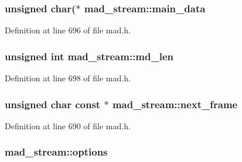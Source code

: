 \subsubsection[{\texorpdfstring{main\+\_\+data}{main_data}}]{\setlength{\rightskip}{0pt plus 5cm}unsigned char($\ast$ mad\+\_\+stream\+::main\+\_\+data}\hypertarget{structmad__stream_a267dab6426706cbb38fe793d01c49c68}{}\label{structmad__stream_a267dab6426706cbb38fe793d01c49c68}


Definition at line 696 of file mad.\+h.

\subsubsection[{\texorpdfstring{md\+\_\+len}{md_len}}]{\setlength{\rightskip}{0pt plus 5cm}unsigned {\bf int} mad\+\_\+stream\+::md\+\_\+len}\hypertarget{structmad__stream_a06e0426b821403e0d6f18482793d556e}{}\label{structmad__stream_a06e0426b821403e0d6f18482793d556e}


Definition at line 698 of file mad.\+h.

\subsubsection[{\texorpdfstring{next\+\_\+frame}{next_frame}}]{\setlength{\rightskip}{0pt plus 5cm}unsigned char {\bf const} $\ast$ mad\+\_\+stream\+::next\+\_\+frame}\hypertarget{structmad__stream_aa7d05a829f94f389c5591b66899683ae}{}\label{structmad__stream_aa7d05a829f94f389c5591b66899683ae}


Definition at line 690 of file mad.\+h.

\subsubsection[{\texorpdfstring{options}{options}}]{ mad\+\_\+stream\+::options}\hypertarget{structmad__stream_a870d5724cee7de5af658c92dfcb48236}{}\label{structmad__stream_a870d5724cee7de5af658c92dfcb48236}


